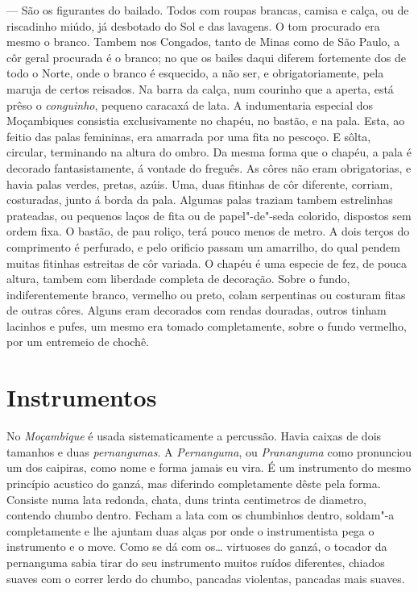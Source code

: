  --- São os figurantes do bailado. Todos com roupas
brancas, camisa e calça, ou de riscadinho miúdo, já desbotado do Sol e
das lavagens. O tom procurado era mesmo o branco. Tambem nos Congados,
tanto de Minas como de São Paulo, a côr geral procurada é o branco; no
que os bailes daqui diferem fortemente dos de todo o Norte, onde o
branco é esquecido, a não ser, e obrigatoriamente, pela maruja de certos
reisados. Na barra da calça, num courinho que a aperta, está prêso o
\emph{conguinho}, pequeno caracaxá de lata. A indumentaria especial dos
Moçambiques consistia exclusivamente no chapéu, no bastão, e na pala.
Esta, ao feitio das palas femininas, era amarrada por uma fita no
pescoço. E sôlta, circular, terminando na altura do ombro. Da mesma
forma que o chapéu, a pala é decorado fantasistamente, á vontade do
freguês. As côres não eram obrigatorias, e havia palas verdes, pretas,
azúis. Uma, duas fitinhas de côr diferente, corriam, costuradas, junto á
borda da pala. Algumas palas traziam tambem estrelinhas prateadas, ou
pequenos laços de fita ou de papel"-de"-seda colorido, dispostos sem ordem
fixa. O bastão, de pau roliço, terá pouco menos de metro. A dois terços
do comprimento é perfurado, e pelo orificio passam um amarrilho, do qual
pendem muitas fitinhas estreitas de côr variada. O chapéu é uma especie
de fez, de pouca altura, tambem com liberdade completa de decoração.
Sobre o fundo, indiferentemente branco, vermelho ou preto, colam
serpentinas ou costuram fitas de outras côres. Alguns eram decorados com
rendas douradas, outros tinham lacinhos e pufes, um mesmo era tomado
completamente, sobre o fundo vermelho, por um entremeio de chochê.

\section*{Instrumentos}

No \emph{Moçambique} é usada sistematicamente a percussão. Havia caixas
de dois tamanhos e duas \emph{pernangumas}. A \emph{Pernanguma}, ou
\emph{Prananguma} como pronunciou um dos caipiras, como nome e forma
jamais eu vira. É um instrumento do mesmo princípio acustico do ganzá,
mas diferindo completamente dêste pela forma. Consiste numa lata
redonda, chata, duns trinta centimetros de diametro, contendo chumbo
dentro. Fecham a lata com os chumbinhos dentro, soldam"-a completamente e
lhe ajuntam duas alças por onde o instrumentista pega o instrumento e o
move. Como se dá com os\ldots{} virtuoses do ganzá, o tocador da pernanguma
sabia tirar do seu instrumento muitos ruídos diferentes, chiados suaves
com o correr lerdo do chumbo, pancadas violentas, pancadas mais suaves.

